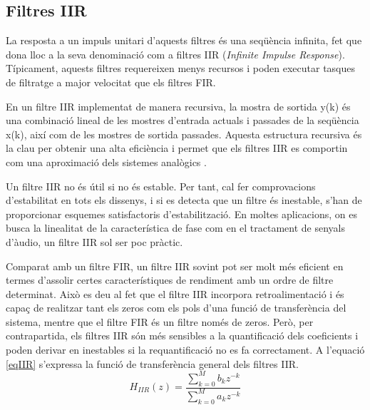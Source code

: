 \subsection{Filtres IIR}
\par La resposta a un impuls unitari d'aquests filtres és una seqüència infinita, fet que dona lloc a la seva denominació com a filtres IIR (\textit{Infinite Impulse Response}). Típicament, aquests filtres requereixen menys recursos i poden executar tasques de filtratge a major velocitat que els filtres FIR. 
\par En un filtre IIR implementat de manera recursiva, la mostra de sortida y(k) és una combinació lineal de les mostres d’entrada actuals i passades de la seqüència x(k), així com de les mostres de sortida passades. Aquesta estructura recursiva és la clau per obtenir una alta eficiència i permet que els filtres IIR es comportin com una aproximació dels sistemes analògics \cite{Bose1985}.
\par Un filtre IIR no és útil si no és estable. Per tant, cal fer comprovacions d'estabilitat en tots els dissenys, i si es detecta que un filtre és inestable, s’han de proporcionar esquemes satisfactoris d'estabilització. En moltes aplicacions, on es busca la linealitat de la característica de fase com en el tractament de senyals d'àudio, un filtre IIR sol ser poc pràctic\cite{DigitalSignalPr}.
\par Comparat amb un filtre FIR, un filtre IIR sovint pot ser molt més eficient en termes d'assolir certes característiques de rendiment amb un ordre de filtre determinat. Això es deu al fet que el filtre IIR incorpora retroalimentació i és capaç de realitzar tant els zeros com els pols d'una funció de transferència del sistema, mentre que el filtre FIR és un filtre només de zeros. Però, per contrapartida, els filtres IIR són més sensibles a la quantificació dels coeficients i poden derivar en inestables si la requantificació no es fa correctament. A l'equació \ref{eqIIR} s'expressa la funció de transferència general dels filtres IIR.
\begin{equation}\label{eqIIR}
    H_{IIR}(z) = \frac{\sum_{k=0}^{M} b_k z^{-k}}{\sum_{k=0}^{M} a_k z^{-k}}
\end{equation}

